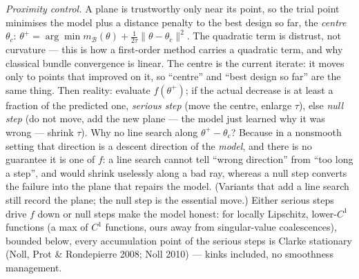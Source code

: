 \documentclass[11pt,a4paper]{article}
\newcommand{\rev}[1]{#1}
\begin{document}
\emph{Proximity control.}  A plane is trustworthy only near its point, so the trial
point minimises the model plus a distance penalty to the best design so far, the
\emph{centre} $\theta_c$: $\theta^+=\arg\min m_{\mathcal B}(\theta)+\tfrac1{2\tau}\|\theta-\theta_c\|^2$.
The quadratic term is distrust, not curvature --- this is how a first-order method
carries a quadratic term, and why classical bundle convergence is linear.  \rev{The centre is the current iterate: it moves only to points that improved on it,
so ``centre'' and ``best design so far'' are the same thing.  Then reality: evaluate
$f(\theta^+)$; if the actual decrease is at least a fraction of the predicted one,
\emph{serious step} (move the centre, enlarge $\tau$), else \emph{null step} (do not
move, add the new plane --- the model just learned why it was wrong --- shrink $\tau$).
Why no line search along $\theta^+-\theta_c$?  Because in a nonsmooth setting that
direction is a descent direction of the \emph{model}, and there is no guarantee it is
one of $f$: a line search cannot tell ``wrong direction'' from ``too long a step'', and
would shrink uselessly along a bad ray, whereas a null step converts the failure into
the plane that repairs the model.  (Variants that add a line search still record the
plane; the null step is the essential move.)}  Either serious steps drive $f$ down or null steps make the model honest: for
locally Lipschitz, lower-$C^1$ functions (a max of $C^1$ functions, ours away from
singular-value coalescences), bounded below, every accumulation point of the serious
steps is Clarke stationary (Noll, Prot \& Rondepierre 2008; Noll 2010) --- kinks
included, no smoothness management.
\end{document}
